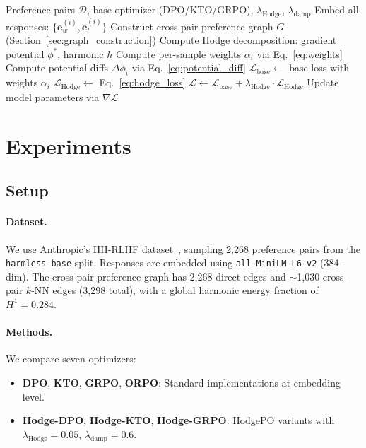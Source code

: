 \documentclass{article}
\begin{document}
\begin{algorithm}[t]
\caption{HodgePO Training}
\label{alg:hodgepo}
\begin{algorithmic}[1]
\REQUIRE Preference pairs $\mathcal{D}$, base optimizer (DPO/KTO/GRPO), $\lambda_\text{Hodge}$, $\lambda_\text{damp}$
\STATE Embed all responses: $\{\mathbf{e}_w^{(i)}, \mathbf{e}_l^{(i)}\}$
\STATE Construct cross-pair preference graph $G$ (Section~\ref{sec:graph_construction})
\STATE Compute Hodge decomposition: gradient potential $\phi^*$, harmonic $h$
\STATE Compute per-sample weights $\alpha_i$ via Eq.~\ref{eq:weights}
\STATE Compute potential diffs $\Delta\phi_i$ via Eq.~\ref{eq:potential_diff}
        \STATE $\mathcal{L}_\text{base} \leftarrow$ base loss with weights $\alpha_i$
        \STATE $\mathcal{L}_\text{Hodge} \leftarrow$ Eq.~\ref{eq:hodge_loss}
        \STATE $\mathcal{L} \leftarrow \mathcal{L}_\text{base} + \lambda_\text{Hodge} \cdot \mathcal{L}_\text{Hodge}$
        \STATE Update model parameters via $\nabla \mathcal{L}$
    \ENDFOR
\ENDFOR
\end{algorithmic}
\end{algorithm}

\section{Experiments}
\label{sec:experiments}

\subsection{Setup}

\paragraph{Dataset.} We use Anthropic's HH-RLHF dataset~\citep{bai2022training}, sampling 2,268 preference pairs from the \texttt{harmless-base} split. Responses are embedded using \texttt{all-MiniLM-L6-v2} (384-dim). The cross-pair preference graph has 2,268 direct edges and $\sim$1,030 cross-pair $k$-NN edges (3,298 total), with a global harmonic energy fraction of $H^1 = 0.284$.

\paragraph{Methods.} We compare seven optimizers:
\begin{itemize}
    \item \textbf{DPO}, \textbf{KTO}, \textbf{GRPO}, \textbf{ORPO}: Standard implementations at embedding level.
    \item \textbf{Hodge-DPO}, \textbf{Hodge-KTO}, \textbf{Hodge-GRPO}: HodgePO variants with $\lambda_\text{Hodge} = 0.05$, $\lambda_\text{damp} = 0.6$.
\end{itemize}
\end{document}
